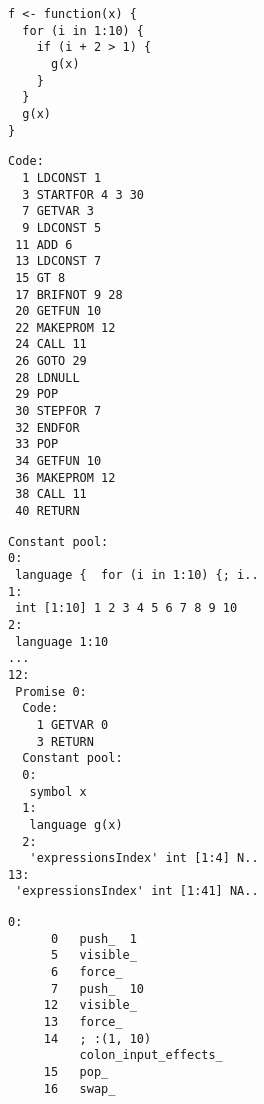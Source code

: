 \begin{listing}[p]
	\centering
	\begin{adjustwidth}{-1cm}{-1cm}
		\begin{minipage}{0.18\textwidth}
			\begin{verbatim}
f <- function(x) {
  for (i in 1:10) {
    if (i + 2 > 1) {
      g(x)
    }
  }
  g(x)
}
    \end{verbatim}
			\label{lst:bc-example-r}
		\end{minipage}
		\hfill
		\begin{minipage}{0.80\textwidth}
			\begin{minipage}{0.18\textwidth}
				\begin{verbatim}
Code:
  1 LDCONST 1
  3 STARTFOR 4 3 30
  7 GETVAR 3
  9 LDCONST 5
 11 ADD 6
 13 LDCONST 7
 15 GT 8
 17 BRIFNOT 9 28
 20 GETFUN 10
 22 MAKEPROM 12
 24 CALL 11
 26 GOTO 29
 28 LDNULL
 29 POP
 30 STEPFOR 7
 32 ENDFOR
 33 POP
 34 GETFUN 10
 36 MAKEPROM 12
 38 CALL 11
 40 RETURN
        \end{verbatim}
			\end{minipage}
			\hfill
			\begin{minipage}{0.60\textwidth}
				\begin{verbatim}
Constant pool:
0:
 language {  for (i in 1:10) {; i..
1:
 int [1:10] 1 2 3 4 5 6 7 8 9 10
2:
 language 1:10
...
12:
 Promise 0:
  Code:
    1 GETVAR 0
    3 RETURN
  Constant pool:
  0:
   symbol x
  1:
   language g(x)
  2:
   'expressionsIndex' int [1:4] N..
13:
 'expressionsIndex' int [1:41] NA..
        \end{verbatim}
			\end{minipage}
			\label{lst:bc-example-gnur}
		\end{minipage}
	\end{adjustwidth}
	\par\vspace{2mm}\par
	\begin{minipage}{\textwidth}
		\centering
		\begin{minipage}{0.47\textwidth}
			\begin{verbatim}
0:
      0   push_  1
      5   visible_
      6   force_
      7   push_  10
     12   visible_
     13   force_
     14   ; :(1, 10)
          colon_input_effects_
     15   pop_
     16   swap_

\end{verbatim}
\end{minipage}
\end{minipage}
\end{listing}

